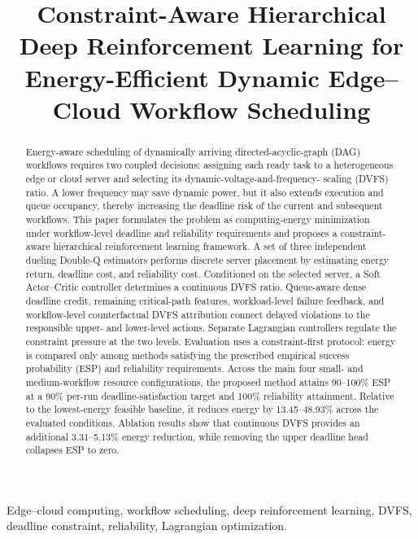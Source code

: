 \documentclass[lettersize,journal]{IEEEtran}
\begin{document}
\title{Constraint-Aware Hierarchical Deep Reinforcement Learning for Energy-Efficient Dynamic Edge--Cloud Workflow Scheduling}

\author{%
}

\maketitle

\begin{abstract}
Energy-aware scheduling of dynamically arriving directed-acyclic-graph (DAG)
workflows requires two coupled decisions: assigning each ready task to a
heterogeneous edge or cloud server and selecting its dynamic-voltage-and-frequency-
scaling (DVFS) ratio. A lower frequency may save dynamic power, but it also
extends execution and queue occupancy, thereby increasing the deadline risk of
the current and subsequent workflows. This paper formulates the problem as
computing-energy minimization under workflow-level deadline and reliability
requirements and proposes a constraint-aware hierarchical reinforcement learning
framework. A set of three independent dueling Double-Q estimators performs discrete
server placement by estimating energy return, deadline cost, and reliability cost.
Conditioned on the selected server, a Soft Actor--Critic controller determines
a continuous DVFS ratio. Queue-aware dense deadline credit, remaining
critical-path features, workload-level failure feedback, and workflow-level
counterfactual DVFS attribution connect delayed violations to the responsible
upper- and lower-level actions. Separate Lagrangian controllers regulate the
constraint pressure at the two levels. Evaluation uses a constraint-first
protocol: energy is compared only among methods satisfying the prescribed
empirical success probability (ESP) and reliability requirements. Across the main
four small- and medium-workflow resource configurations, the proposed method attains 90--100\% ESP at a
90\% per-run deadline-satisfaction target and 100\% reliability attainment.
Relative to the lowest-energy feasible baseline, it reduces energy by
13.45--48.93\% across the evaluated conditions.
Ablation results show that continuous DVFS provides an additional 3.31--5.13\%
energy reduction, while removing the upper deadline head collapses ESP to zero.
\end{abstract}

\begin{IEEEkeywords}
Edge--cloud computing, workflow scheduling, deep reinforcement learning,
DVFS, deadline constraint, reliability, Lagrangian optimization.
\end{IEEEkeywords}
\end{document}

